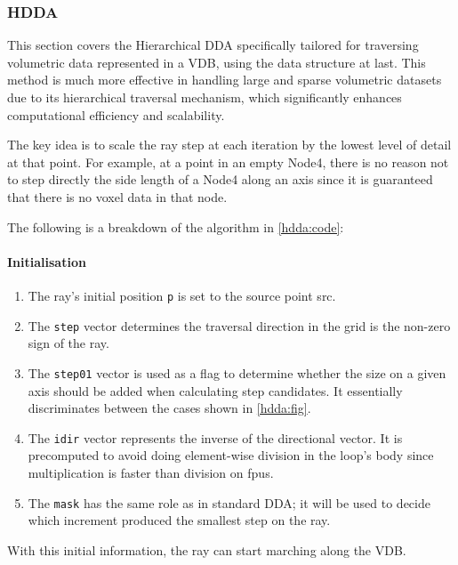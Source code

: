 \subsubsection{HDDA}
This section covers the Hierarchical DDA specifically tailored for traversing volumetric data represented in a VDB, using the data structure at last. This method is much more effective in handling large and sparse volumetric datasets due to its hierarchical traversal mechanism, which significantly enhances computational efficiency and scalability.

The key idea is to scale the ray step at each iteration by the lowest level of detail at that point. For example, at a point in an empty Node4, there is no reason not to step directly the side length of a Node4 along an axis since it is guaranteed that there is no voxel data in that node.

The following is a breakdown of the algorithm in \cref{hdda:code}:
\paragraph{Initialisation}
\begin{enumerate}
  \item The ray's initial position \texttt{p} is set to the source point src.
  \item The \texttt{step} vector determines the traversal direction in the grid is the non-zero sign of the ray.
  \item The \texttt{step01} vector is used as a flag to determine whether the size on a given axis should be added when calculating step candidates.
        It essentially discriminates between the cases shown in \cref{hdda:fig}.
  \item The \texttt{idir} vector represents the inverse of the directional vector.
        It is precomputed to avoid doing element-wise division in the loop's body since multiplication is faster than division on \acrshort{fpu}s.
  \item The \texttt{mask} has the same role as in standard DDA; it will be used to decide which increment produced the smallest step on the ray.
\end{enumerate}
With this initial information, the ray can start marching along the VDB.

